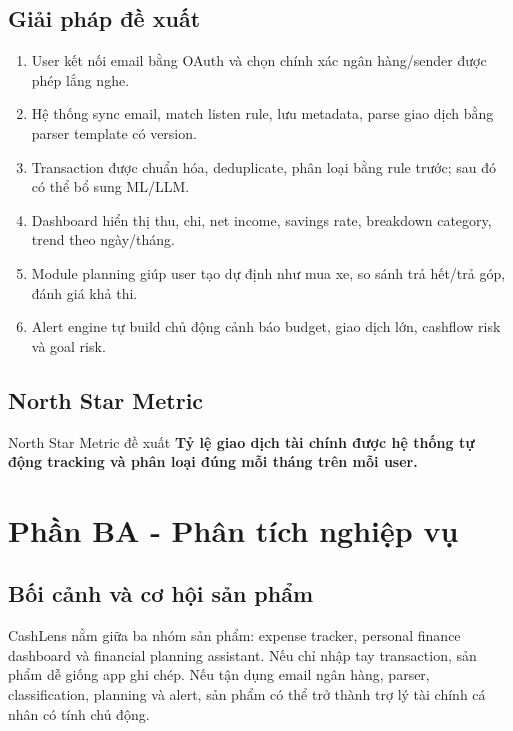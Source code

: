 \documentclass[11pt,a4paper]{article}
\begin{document}
\subsection{Giải pháp đề xuất}
\begin{enumerate}
  \item User kết nối email bằng OAuth và chọn chính xác ngân hàng/sender được phép lắng nghe.
  \item Hệ thống sync email, match listen rule, lưu metadata, parse giao dịch bằng parser template có version.
  \item Transaction được chuẩn hóa, deduplicate, phân loại bằng rule trước; sau đó có thể bổ sung ML/LLM.
  \item Dashboard hiển thị thu, chi, net income, savings rate, breakdown category, trend theo ngày/tháng.
  \item Module planning giúp user tạo dự định như mua xe, so sánh trả hết/trả góp, đánh giá khả thi.
  \item Alert engine tự build chủ động cảnh báo budget, giao dịch lớn, cashflow risk và goal risk.
\end{enumerate}

\subsection{North Star Metric}
\begin{notebox}{North Star Metric đề xuất}
\textbf{Tỷ lệ giao dịch tài chính được hệ thống tự động tracking và phân loại đúng mỗi tháng trên mỗi user.}
\end{notebox}

\section{Phần BA - Phân tích nghiệp vụ}

\subsection{Bối cảnh và cơ hội sản phẩm}
CashLens nằm giữa ba nhóm sản phẩm: expense tracker, personal finance dashboard và financial planning assistant. Nếu chỉ nhập tay transaction, sản phẩm dễ giống app ghi chép. Nếu tận dụng email ngân hàng, parser, classification, planning và alert, sản phẩm có thể trở thành trợ lý tài chính cá nhân có tính chủ động.
\end{document}
